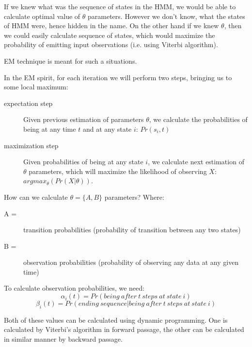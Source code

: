 \documentclass[12pt,a4paper,english]{article}
\begin{document}
If we knew what was the sequence of states in the HMM, we would be able to calculate optimal value of $\theta$ parameters. However we don't know, what the states of HMM were, hence hidden in the name. On the other hand if we knew $\theta$, then we could easily calculate sequence of states, which would maximize the probability of emitting input observations (i.e. using Viterbi algorithm). \newline

EM technique is meant for such a situations. \newline

In the EM spirit, for each iteration we will perform two steps, bringing us to some local maximum: \newline
\begin{description}
    \item[expectation step]
	Given previous estimation of parameters $\theta$, we calculate the probabilities of being at any time $t$ and at any state $i$: $Pr(s_i, t)$
    \item[maximization step]
	Given probabilities of being at any state $i$, we calculate next estimation of $\theta$ parameters, which will maximize the likelihood of observing $X$: $argmax_\theta(Pr(X | \theta))$.
\end{description}

How can we calculate $\theta = \{A, B\}$ parameters? \newline
Where:
\begin{description}
    \item[A =] transition probabilities (probability of transition between any two states)
	\item[B =] observation probabilities (probability of observing any data at any given time)
\end{description}

To calculate observation probabilities, we need:
\begin{equation}
    \alpha_i(t) = Pr(being \: after \: t \: steps \: at \: state \: i)
\end{equation}
\begin{equation}
    \beta_i(t) = Pr(ending \: sequence | being \: after \: t \: steps \: at \: state \: i)
\end{equation}

Both of these values can be calculated using dynamic programming. One is calculated by Viterbi's algorithm in forward passage, the other can be calculated in similar manner by backward passage.
\end{document}
